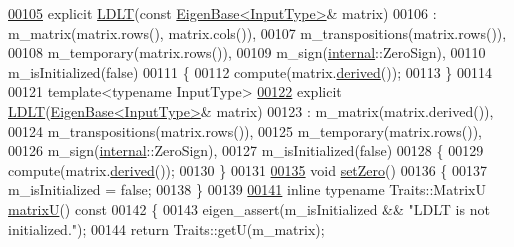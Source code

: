 \begin{DoxyCode}
\hyperlink{group___cholesky___module_ad0e8d2131ea1a626a08d98e9effb1cc5}{00105}     \textcolor{keyword}{explicit} \hyperlink{group___cholesky___module_ad0e8d2131ea1a626a08d98e9effb1cc5}{LDLT}(\textcolor{keyword}{const} \hyperlink{group___core___module_struct_eigen_1_1_eigen_base}{EigenBase<InputType>}& matrix)
00106       : m\_matrix(matrix.rows(), matrix.cols()),
00107         m\_transpositions(matrix.rows()),
00108         m\_temporary(matrix.rows()),
00109         m\_sign(\hyperlink{namespaceinternal}{internal}::ZeroSign),
00110         m\_isInitialized(false)
00111     \{
00112       compute(matrix.\hyperlink{group___core___module_a324b16961a11d2ecfd2d1b7dd7946545}{derived}());
00113     \}
00114 
00121     \textcolor{keyword}{template}<\textcolor{keyword}{typename} InputType>
\hyperlink{group___cholesky___module_adf853d6cbbc49f3535a44439bca344d9}{00122}     \textcolor{keyword}{explicit} \hyperlink{group___cholesky___module_adf853d6cbbc49f3535a44439bca344d9}{LDLT}(\hyperlink{group___core___module_struct_eigen_1_1_eigen_base}{EigenBase<InputType>}& matrix)
00123       : m\_matrix(matrix.derived()),
00124         m\_transpositions(matrix.rows()),
00125         m\_temporary(matrix.rows()),
00126         m\_sign(\hyperlink{namespaceinternal}{internal}::ZeroSign),
00127         m\_isInitialized(false)
00128     \{
00129       compute(matrix.\hyperlink{group___core___module_a324b16961a11d2ecfd2d1b7dd7946545}{derived}());
00130     \}
00131 
\hyperlink{group___cholesky___module_a776d0ab6c980847297d25b03b5d2216a}{00135}     \textcolor{keywordtype}{void} \hyperlink{group___cholesky___module_a776d0ab6c980847297d25b03b5d2216a}{setZero}()
00136     \{
00137       m\_isInitialized = \textcolor{keyword}{false};
00138     \}
00139 
\hyperlink{group___cholesky___module_a54838a2e31e53bbe4dcb78b5e80c8484}{00141}     \textcolor{keyword}{inline} \textcolor{keyword}{typename} Traits::MatrixU \hyperlink{group___cholesky___module_a54838a2e31e53bbe4dcb78b5e80c8484}{matrixU}()\textcolor{keyword}{ const}
00142 \textcolor{keyword}{    }\{
00143       eigen\_assert(m\_isInitialized && \textcolor{stringliteral}{"LDLT is not initialized."});
00144       \textcolor{keywordflow}{return} Traits::getU(m\_matrix);

\end{DoxyCode}
